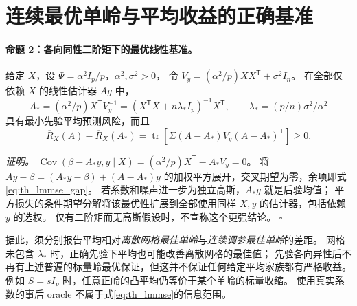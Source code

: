 \section{连续最优单岭与平均收益的正确基准}\label{sec:theory_bayes}
\paragraph{命题 2：各向同性二阶矩下的最优线性基准。}
给定 $X$，设 $\Psi=\alpha^2I_p/p$，$\alpha^2,\sigma^2>0$，
令 $V_y=(\alpha^2/p)XX^{\mathsf T}+\sigma^2I_n$。
在全部仅依赖 $X$ 的线性估计器 $Ay$ 中，
\begin{equation}\label{eq:th_lmmse}
 A_*=(\alpha^2/p)X^{\mathsf T}V_y^{-1}
 =(X^{\mathsf T}X+n\lambda_*I_p)^{-1}X^{\mathsf T},\qquad
 \lambda_*=(p/n)\sigma^2/\alpha^2
\end{equation}
具有最小先验平均预测风险，而且
\begin{equation}\label{eq:th_lmmse_gap}
 \overline R_X(A)-\overline R_X(A_*)
 =\operatorname{tr}\!\left[\Sigma(A-A_*)V_y(A-A_*)^{\mathsf T}\right]\ge0.
\end{equation}

\textit{证明。}
$\operatorname{Cov}(\beta-A_*y,y\mid X)=(\alpha^2/p)X^{\mathsf T}-A_*V_y=0$。
将 $Ay-\beta=(A_*y-\beta)+(A-A_*)y$ 的加权平方展开，交叉期望为零，余项即式\eqref{eq:th_lmmse_gap}。
若系数和噪声进一步为独立高斯，$A_*y$ 就是后验均值；
平方损失的条件期望分解将该最优性扩展到全部使用同样 $X,y$ 的估计器，包括依赖 $y$ 的选权。
仅有二阶矩而无高斯假设时，不宣称这个更强结论。
\hfill$\square$

据此，须分别报告平均相对\emph{离散网格最佳单岭}与\emph{连续调参最佳单岭}的差距。
网格未包含 $\lambda_*$ 时，正确先验下平均也可能改善离散网格的最佳值；
先验各向异性后不再有上述普遍的标量岭最优保证，但这并不保证任何给定平均家族都有严格收益。
例如 $S=sI_p$ 时，任意正岭的凸平均仍等价于某个单岭的标量收缩。
使用真实系数的事后 oracle 不属于式\eqref{eq:th_lmmse}的信息范围。

